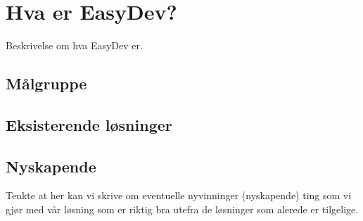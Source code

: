 \chapter{Hva er EasyDev?}
Beskrivelse om hva EasyDev er.
\section{Målgruppe}
\section{Eksisterende løsninger}
\section{Nyskapende}
Tenkte at her kan vi skrive om eventuelle nyvinninger (nyskapende) ting som vi gjør med vår løsning som er riktig bra utefra de løsninger som alerede er tilgelige.